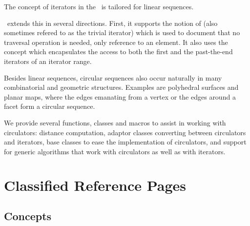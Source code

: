 

The concept of iterators in the \stl\ is tailored for linear sequences.

\cgal\ extends this in several directions.  First, it supports the notion
of  (also sometimes refered to as the trivial iterator) which is
used to document that no traversal operation is needed, only reference to an
element.  It also uses the  concept which encapsulates the access to
both the first and the past-the-end iterators of an iterator range.

Besides linear sequences, circular sequences also occur naturally in many combinatorial
and geometric structures. Examples are polyhedral surfaces and planar
maps, where the edges emanating from a vertex or the edges around a
facet form a circular sequence. 

We provide several functions, classes and macros to assist in working
with circulators: distance computation, adaptor classes converting
between circulators and iterators, base classes to ease the implementation
of circulators, and support for generic algorithms that work with
circulators as well as with iterators.

\section{Classified Reference Pages}

\subsection*{Concepts}

\\
\\
\\
\\
\\
\\

